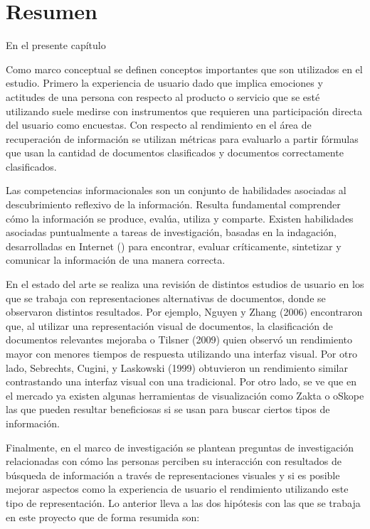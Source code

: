 \section{Resumen}
\label{sec:marco_estado_arte_resumen}
En el presente capítulo

Como marco conceptual se definen conceptos importantes que son utilizados en el estudio. Primero la experiencia de usuario dado que implica emociones y actitudes de una persona con respecto al producto o servicio que se esté utilizando suele medirse con instrumentos que requieren una participación directa del usuario como encuestas. Con respecto al rendimiento en el área de recuperación de información se utilizan métricas para evaluarlo a partir fórmulas que usan la cantidad de documentos clasificados y documentos correctamente clasificados.

Las competencias informacionales son un conjunto de habilidades asociadas al descubrimiento reflexivo de la información. Resulta fundamental comprender cómo la información se produce, evalúa, utiliza y comparte. Existen habilidades asociadas puntualmente a tareas de investigación, basadas en la indagación, desarrolladas en Internet () para encontrar, evaluar críticamente, sintetizar y comunicar la información de una manera correcta.

En el estado del arte se realiza una revisión de distintos estudios de usuario en los que se trabaja con representaciones alternativas de documentos, donde se observaron distintos resultados. Por ejemplo, Nguyen y Zhang (2006) encontraron que, al utilizar una representación visual de documentos, la clasificación de documentos relevantes mejoraba o Tilsner (2009) quien observó un rendimiento mayor con menores tiempos de respuesta utilizando una interfaz visual. Por otro lado, Sebrechts, Cugini, y Laskowski (1999) obtuvieron un rendimiento similar contrastando una interfaz visual con una tradicional. Por otro lado, se ve que en el mercado ya existen algunas herramientas de visualización como Zakta o oSkope las que pueden resultar beneficiosas si se usan para buscar ciertos tipos de información.

Finalmente, en el marco de investigación se plantean preguntas de investigación relacionadas con cómo las personas perciben su interacción con resultados de búsqueda de información a través de representaciones visuales y si es posible mejorar aspectos como la experiencia de usuario el rendimiento utilizando este tipo de representación. Lo anterior lleva a las dos hipótesis con las que se trabaja en este proyecto que de forma resumida son:

